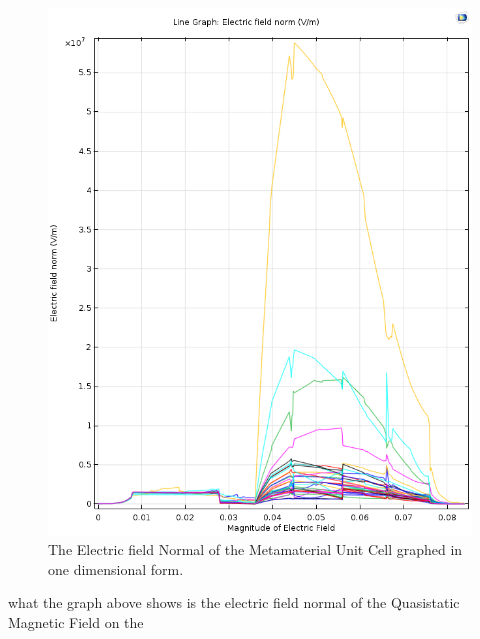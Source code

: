 \documentclass[]{article}
\begin{document}
\begin{figure}[H]
	\centering
	\includegraphics[width=10.5 cm, height=10.5 cm]{OneDElectricFieldNormalGraphImage.png}
	\caption{The Electric field Normal of the Metamaterial Unit Cell graphed in one dimensional form.}
	\label{test8128382}
\end{figure}
\noindent
what the graph above shows is the electric field normal of the Quasistatic Magnetic Field on the 
\end{document}
